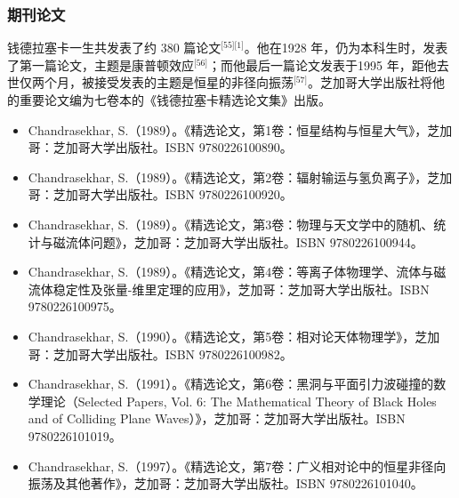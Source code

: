 \subsubsection{期刊论文}
钱德拉塞卡一生共发表了约 380 篇论文\(^\text{[55][1]}\)。他在1928 年，仍为本科生时，发表了第一篇论文，主题是康普顿效应\(^\text{[56]}\)；而他最后一篇论文发表于1995 年，距他去世仅两个月，被接受发表的主题是恒星的非径向振荡\(^\text{[57]}\)。芝加哥大学出版社将他的重要论文编为七卷本的《钱德拉塞卡精选论文集》出版。
\begin{itemize}
\item Chandrasekhar, S.（1989）。《精选论文，第1卷：恒星结构与恒星大气》，芝加哥：芝加哥大学出版社。ISBN 9780226100890。
\item Chandrasekhar, S.（1989）。《精选论文，第2卷：辐射输运与氢负离子》，芝加哥：芝加哥大学出版社。ISBN 9780226100920。
\item Chandrasekhar, S.（1989）。《精选论文，第3卷：物理与天文学中的随机、统计与磁流体问题》，芝加哥：芝加哥大学出版社。ISBN 9780226100944。
\item Chandrasekhar, S.（1989）。《精选论文，第4卷：等离子体物理学、流体与磁流体稳定性及张量-维里定理的应用》，芝加哥：芝加哥大学出版社。ISBN 9780226100975。
\item Chandrasekhar, S.（1990）。《精选论文，第5卷：相对论天体物理学》，芝加哥：芝加哥大学出版社。ISBN 9780226100982。
\item Chandrasekhar, S.（1991）。《精选论文，第6卷：黑洞与平面引力波碰撞的数学理论（Selected Papers, Vol. 6: The Mathematical Theory of Black Holes and of Colliding Plane Waves）》，芝加哥：芝加哥大学出版社。ISBN 9780226101019。
\item Chandrasekhar, S.（1997）。《精选论文，第7卷：广义相对论中的恒星非径向振荡及其他著作》，芝加哥：芝加哥大学出版社。ISBN 9780226101040。
\end{itemize}
